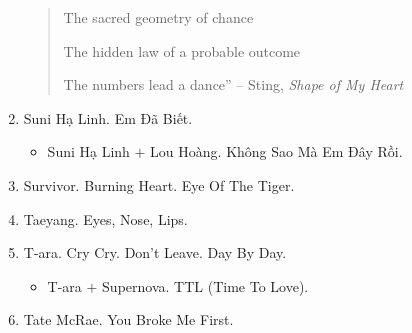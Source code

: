 \documentclass{article}
\begin{document}
\begin{enumerate}
\begin{quotation}
		The sacred geometry of chance
		
		The hidden law of a probable outcome
		
		The numbers lead a dance'' -- Sting, {\it Shape of My Heart}
	\end{quotation}
	\item {\sc Suni Hạ Linh.} Em Đã Biết.
	\begin{itemize}
		\item {\sc Suni Hạ Linh $+$ Lou Hoàng.} Không Sao Mà Em Đây Rồi.
	\end{itemize}
	\item {\sc Survivor.} Burning Heart. Eye Of The Tiger.
	\item {\sc Taeyang.} Eyes, Nose, Lips.
	\item {\sc T-ara.} Cry Cry. Don't Leave. Day By Day.
	\begin{itemize}
		\item {\sc T-ara $+$ Supernova.} TTL (Time To Love).
	\end{itemize}
	\item {\sc Tate McRae.} You Broke Me First.

\end{enumerate}
\end{document}
